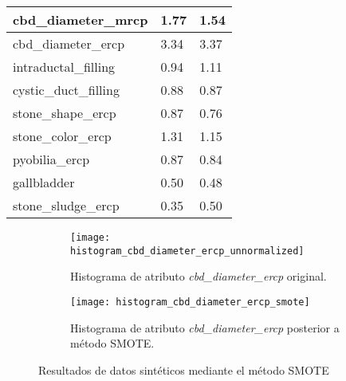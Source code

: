 \begin{table}[!htb]
\begin{tabular}{|l|ll|}
cbd\_diameter\_mrcp                                      & \multicolumn{1}{l|}{1.77}              & 1.54                                 \\ \hline
cbd\_diameter\_ercp                                      & \multicolumn{1}{l|}{3.34}              & 3.37                                 \\ \hline
intraductal\_filling                                     & \multicolumn{1}{l|}{0.94}              & 1.11                                 \\ \hline
cystic\_duct\_filling                                    & \multicolumn{1}{l|}{0.88}              & 0.87                                 \\ \hline
stone\_shape\_ercp                                       & \multicolumn{1}{l|}{0.87}              & 0.76                                 \\ \hline
stone\_color\_ercp                                       & \multicolumn{1}{l|}{1.31}              & 1.15                                 \\ \hline
pyobilia\_ercp                                           & \multicolumn{1}{l|}{0.87}              & 0.84                                 \\ \hline
gallbladder                                              & \multicolumn{1}{l|}{0.50}              & 0.48                                 \\ \hline
stone\_sludge\_ercp                                      & \multicolumn{1}{l|}{0.35}              & 0.50                                 \\ \hline
\end{tabular}
\end{table}

\begin{figure}[!htb]
	\centering
	\begin{subfigure}[b]{0.4\textwidth}
		\centering
		\texttt{[image: histogram\_cbd\_diameter\_ercp\_unnormalized]}
		\caption{Histograma de atributo \emph{cbd\_diameter\_ercp} original.}
	\end{subfigure}
	\hfill
	\begin{subfigure}[b]{0.4\textwidth}
		\centering
		\texttt{[image: histogram\_cbd\_diameter\_ercp\_smote]}
		\caption{Histograma de atributo \emph{cbd\_diameter\_ercp} posterior a método SMOTE.}
	\end{subfigure}
	\caption{Resultados de datos sintéticos mediante el método SMOTE}
	\label{Fig: smote-hist}
\end{figure}
